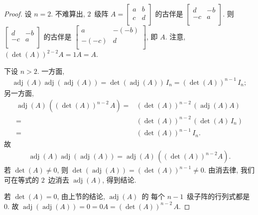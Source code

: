 \documentclass[../libro.tex]{subfiles}
\begin{document}
\begin{proof}
    设 \(n = 2\).
    不难算出, \(2\)~级阵
    \(A =
        \begin{bmatrix}
            a & b \\
            c & d \\
        \end{bmatrix}
    \)
    的古伴是
    \(
        \begin{bmatrix}
            d  & -b \\
            -c & a  \\
        \end{bmatrix}
    \).
    则
    \(
        \begin{bmatrix}
            d  & -b \\
            -c & a  \\
        \end{bmatrix}
    \)
    的古伴是
    \(
        \begin{bmatrix}
            a     & -(-b) \\
            -(-c) & d     \\
        \end{bmatrix}
    \),
    即 \(A\).
    注意,
    \((\det {(A)})^{2-2} A = 1 A = A\).

    下设 \(n > 2\).
    一方面,
    \begin{align*}
        \operatorname{adj} {(A)}
        \operatorname{adj} {(\operatorname{adj} {(A)})}
        = \det {(\operatorname{adj} {(A)})}\, I_n
        = (\det {(A)})^{n-1}\, I_n;
    \end{align*}
    另一方面,
    \begin{align*}
        \operatorname{adj} {(A)}\,
        ((\det {(A)})^{n-2}\, A)
        = {} &
        (\det {(A)})^{n-2}\,
        (\operatorname{adj} {(A)} A)
        \\
        = {} &
        (\det {(A)})^{n-2}\, (\det {(A)}\,I_n)
        \\
        = {} &
        (\det {(A)})^{n-1}\, I_n.
    \end{align*}
    故
    \begin{align*}
        \operatorname{adj} {(A)}
        \operatorname{adj} {(\operatorname{adj} {(A)})}
        =
        \operatorname{adj} {(A)}\,
        ((\det {(A)})^{n-2} A).
    \end{align*}
    若 \(\det {(A)} \neq 0\),
    则 \(\det {(\operatorname{adj} {(A)})}
    = (\det {(A)})^{n-1} \neq 0\).
    由消去律,
    我们可在等式的 \(2\)~边消去 \(\operatorname{adj} {(A)}\),
    得到结论.

    若 \(\det {(A)} = 0\),
    由上节的结论, \(\operatorname{adj} {(A)}\)~的%
    每个 \(n-1\)~级子阵的行列式都是 \(0\).
    故 \(\operatorname{adj} {(\operatorname{adj} {(A)})}
    = 0 = 0A = (\det {(A)})^{n-2}\,A\).
\end{proof}
\end{document}
